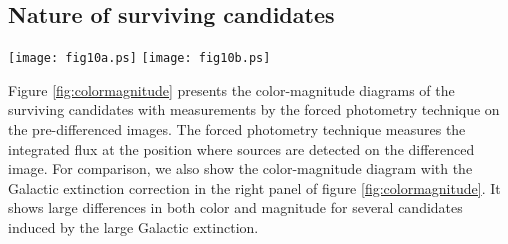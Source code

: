 \documentclass[]{pasj01}
\begin{document}
\subsection{Nature of surviving candidates}
\begin{figure*}
 \begin{center}
   \texttt{[image: fig10a.ps]} 
   \texttt{[image: fig10b.ps]} 
 \end{center}
\caption{Color-magnitude diagram for the surviving candidates ($(i-z)_{\rm 1st}>0.5$ and $\Delta i>1.0$; Procedures {\bf 4a,b}).
The left panel shows the color-magnitude diagram without Galactic extinction correction, while the right panel shows that with Galactic extinction correction using a dust map \citep{1998ApJ...500..525S}.
The selection condition is the same as in Figure \ref{fig:dmdcolor}.
The red stars denote candidates residing offset from the Galactic plane $|b|>5^{\circ}$, while the black stars denote the others.
The dots are candidates without a stellar-like counterpart.
The connecting lines represent the paths for each candidate.
All the candidates close to the Galactic plane tend to become brighter and bluer after the Galactic extinction correction.
The shaded region indicates the approximate region for M-dwarfs.
}\label{fig:colormagnitude}
\end{figure*}
Figure \ref{fig:colormagnitude} presents the color-magnitude diagrams of the surviving candidates with measurements by the forced photometry technique on the pre-differenced images.
The forced photometry technique measures the integrated flux at the position where sources are detected on the differenced image.
For comparison, we also show the color-magnitude diagram with the Galactic extinction correction  \citep{1998ApJ...500..525S} in the right panel of figure \ref{fig:colormagnitude}. It shows large differences in both color and magnitude for several candidates induced by the large Galactic extinction.
\end{document}
